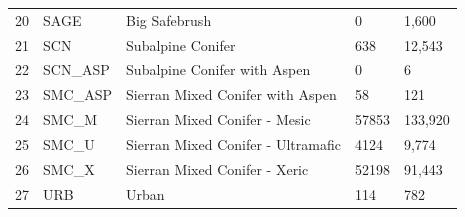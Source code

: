 \begin{table}[!htbp]
\begin{tabular}{@{}lllll@{}}
20                                                          & SAGE                                                               & Big Safebrush                                & 0     		                                              & 1,600                                                      \\
\rowcolor[HTML]{CAD6BA} 
21                                                          & SCN                                                                & Subalpine Conifer                            & 638   		                                              & 12,543                                                     \\
22                                                          & SCN\_ASP                                                           & Subalpine Conifer with Aspen                 & 0     		                                              & 6                                                          \\
\rowcolor[HTML]{CAD6BA} 
23                                                          & SMC\_ASP                                                           & Sierran Mixed Conifer with Aspen             & 58    		                                              & 121                                                        \\
24                                                          & SMC\_M                                                             & Sierran Mixed Conifer - Mesic                & 57853 		                                              & 133,920                                                    \\
\rowcolor[HTML]{CAD6BA} 
25                                                          & SMC\_U                                                             & Sierran Mixed Conifer - Ultramafic           & 4124  		                                              & 9,774                                                      \\
26                                                          & SMC\_X                                                             & Sierran Mixed Conifer - Xeric                & 52198 		                                              & 91,443                                                     \\
\rowcolor[HTML]{CAD6BA} 
27                                                          & URB                                                                & Urban                                        & 114   		                                              & 782                                                        \\

\end{tabular}
\end{table}
